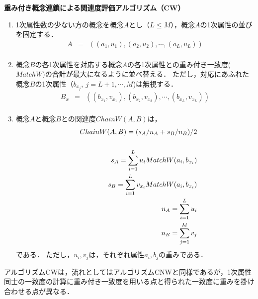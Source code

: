 {\bf 重み付き概念連鎖による関連度評価アルゴリズム（CW）}
\begin{enumerate}
\item 1次属性数の少ない方の概念を概念$A$とし（$L \le M$），概念$A$の1次属性の並びを固定する．
	\begin{eqnarray}
	A &=& ((a_1, u_1), (a_2, u_2), \cdots, (a_L, u_L)) \nonumber \\
	\end{eqnarray}
\item 概念$B$の各1次属性を対応する概念$A$の各1次属性との重み付き一致度($MatchW$)の合計が最大になるように並べ替える．
ただし，対応にあふれた概念$B$の1次属性（$b_{x_j}, \ j=L+1, \cdots, M$)は無視する．
	\begin{eqnarray}
	B_x &=& ((b_{x_1}, v_{x_1}), (b_{x_2}, v_{x_2}), 
	\cdots, (b_{x_L}, v_{x_L})) \nonumber \\
	\end{eqnarray}
\item 概念$A$と概念$B$との関連度$ChainW(A,B)$は，
	\begin{eqnarray}
&&	ChainW(A,B) = (s_A/n_A + s_B/n_B)/2 \label{EchainW} \nonumber \\
	\\
&& \hspace*{1cm} s_A = \sum_{i=1}^L u_i MatchW(a_i, b_{x_i})  \nonumber \\
&& \hspace*{1cm} s_B = \sum_{i=1}^L v_{x_i} MatchW(a_i, b_{x_i}) \nonumber \\
&& \hspace*{1cm} n_A = \sum_{i=1}^{L} u_i \nonumber \\
&& \hspace*{1cm} n_B = \sum_{j=1}^{M} v_j \nonumber
	\end{eqnarray}
である．
ただし，$u_i, v_j$は，それぞれ属性$a_i, b_j$の重みである．
\end{enumerate}

アルゴリズムCWは，流れとしてはアルゴリズムCNWと同様であるが，1次属性同士の一致度の計算に重み付き一致度を用いる点と得られた一致度に重みを掛け合わせる点が異なる．

